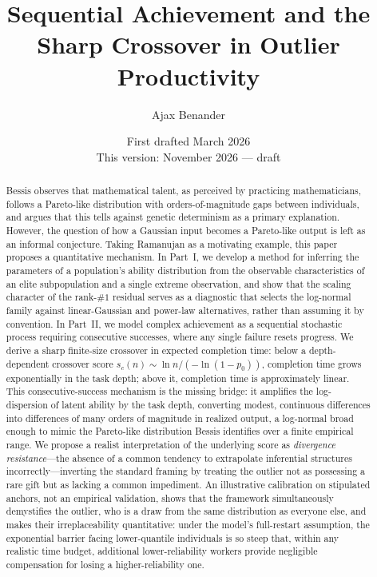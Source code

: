 \documentclass{article}
\title{Sequential Achievement and the Sharp Crossover in Outlier Productivity}
\author{Ajax Benander}
\date{First drafted March 2026\\ {\small This version: November 2026 --- draft}}
\begin{document}
\maketitle

\begin{abstract}
Bessis \cite{bessis2024mathematica,bessis2025genes} observes that mathematical talent, as perceived by practicing mathematicians, follows a Pareto-like distribution with orders-of-magnitude gaps between individuals, and argues that this tells against genetic determinism as a primary explanation. However, the question of how a Gaussian input becomes a Pareto-like output is left as an informal conjecture. Taking Ramanujan as a motivating example, this paper proposes a quantitative mechanism. In Part~I, we develop a method for inferring the parameters of a population's ability distribution from the observable characteristics of an elite subpopulation and a single extreme observation, and show that the scaling character of the rank-$\#1$ residual serves as a diagnostic that selects the log-normal family against linear-Gaussian and power-law alternatives, rather than assuming it by convention. In Part~II, we model complex achievement as a sequential stochastic process requiring consecutive successes, where any single failure resets progress. We derive a sharp finite-size crossover in expected completion time: below a depth-dependent crossover score $s_c(n) \sim \ln n/(-\ln(1-p_0))$, completion time grows exponentially in the task depth; above it, completion time is approximately linear. This consecutive-success mechanism is the missing bridge: it amplifies the log-dispersion of latent ability by the task depth, converting modest, continuous differences into differences of many orders of magnitude in realized output, a log-normal broad enough to mimic the Pareto-like distribution Bessis identifies over a finite empirical range. We propose a realist interpretation of the underlying score as \emph{divergence resistance}---the absence of a common tendency to extrapolate inferential structures incorrectly---inverting the standard framing by treating the outlier not as possessing a rare gift but as lacking a common impediment. An illustrative calibration on stipulated anchors, not an empirical validation, shows that the framework simultaneously demystifies the outlier, who is a draw from the same distribution as everyone else, and makes their irreplaceability quantitative: under the model's full-restart assumption, the exponential barrier facing lower-quantile individuals is so steep that, within any realistic time budget, additional lower-reliability workers provide negligible compensation for losing a higher-reliability one.

\end{abstract}
\end{document}
